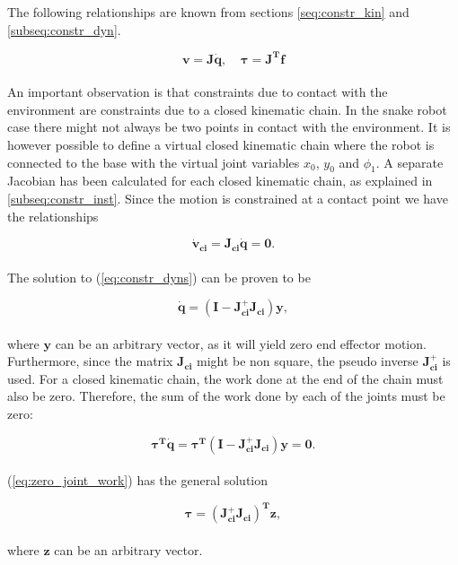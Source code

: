 The following relationships are known from sections \ref{seq:constr_kin} and \ref{subseq:constr_dyn}. 

\begin{equation}
	\mathbf{v = J \dot{q}} \textrm{,} \quad  \  \boldsymbol{\tau} \mathbf{= J^T f}
\end{equation}
\\
An important observation is that constraints due to contact with the environment are constraints due to a closed kinematic chain. In the snake robot case there might not always be two points in contact with the environment. It is however possible to define a virtual closed kinematic chain where the robot is connected to the base with the virtual joint variables $x_0$, $y_0$ and $\phi_1$.
A separate Jacobian has been calculated for each closed kinematic chain, as explained in \ref{subseq:constr_inst}.
Since the motion is constrained at a contact point we have the relationships

\begin{equation} \label{eq:constr_dyns}
    \mathbf{\dot{v}_{ci} = J_{ci} \dot{q} = 0}.
\end{equation}
\\
The solution to (\ref{eq:constr_dyns}) can be proven to be

\begin{equation}
    \mathbf{\dot{q} = (I - J_{ci}^+ J_{ci}) y},
\end{equation}
\\
where $\mathbf{y}$ can be an arbitrary vector, as it will yield zero end effector motion. Furthermore, since the matrix $\mathbf{J_{ci}}$ might be non square, the pseudo inverse $\mathbf{J_{ci}^+}$ is used.
For a closed kinematic chain, the work done at the end of the chain must also be zero. Therefore, the sum of the work done by each of the joints must be zero:

\begin{equation} \label{eq:zero_joint_work}
    \boldsymbol{\tau^T} \mathbf{\dot{q}} = \boldsymbol{\tau^T} \mathbf{(I - J_{ci}^+ J_{ci}) y = 0}.
\end{equation}
\\
(\ref{eq:zero_joint_work}) has the general solution

\begin{equation}
   \boldsymbol{\tau}  \mathbf{= (J_{ci}^+ J_{ci})^T z},
\end{equation}
\\
where $\mathbf{z}$ can be an arbitrary vector.

